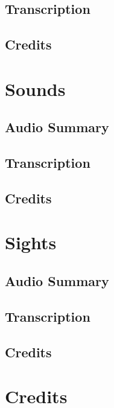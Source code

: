 \subsection{Transcription}

\subsection{Credits}

\section{Sounds}

\subsection{Audio Summary}

\subsection{Transcription}

\subsection{Credits}

\section{Sights}

\subsection{Audio Summary}

\subsection{Transcription}

\subsection{Credits}

\section{Credits}